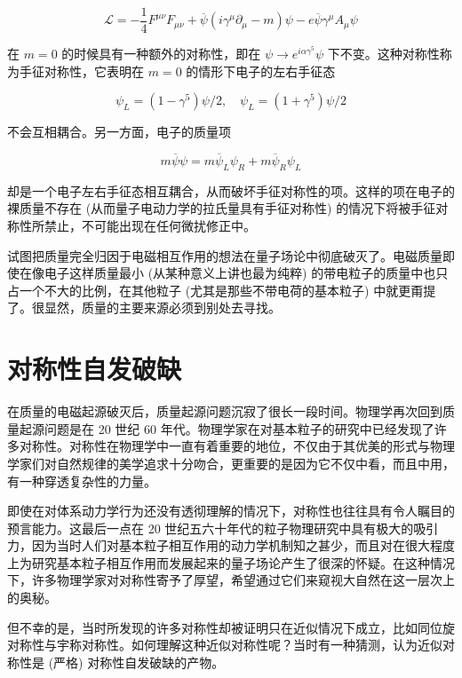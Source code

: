 \begin{equation}
    \mathcal{L} = -\frac{1}{4} F^{\mu\nu} F_{\mu\nu} + \overline{\psi}(i\gamma^\mu\partial_\mu - m) \psi - e \overline{\psi} \gamma^\mu A_\mu \psi
\end{equation}

在 $m=0$ 的时候具有一种额外的对称性，即在 $\psi \to e^{i\alpha\gamma^5} \psi$ 下不变。这种对称性称为手征对称性，它表明在 $m=0$ 的情形下电子的左右手征态

\begin{equation}
    \psi_L = (1-\gamma^5) \psi/2, \quad \psi_L = (1+\gamma^5) \psi/2
\end{equation}

\noindent 不会互相耦合。另一方面，电子的质量项

\begin{equation}
    m \overline{\psi} \psi = m \overline{\psi}_L \psi_R + m \overline{\psi}_R \psi_L
\end{equation}

却是一个电子左右手征态相互耦合，从而破坏手征对称性的项。这样的项在电子的裸质量不存在 (从而量子电动力学的拉氏量具有手征对称性) 的情况下将被手征对称性所禁止，不可能出现在任何微扰修正中。

试图把质量完全归因于电磁相互作用的想法在量子场论中彻底破灭了。电磁质量即使在像电子这样质量最小 (从某种意义上讲也最为纯粹) 的带电粒子的质量中也只占一个不大的比例，在其他粒子 (尤其是那些不带电荷的基本粒子) 中就更甭提了。很显然，质量的主要来源必须到别处去寻找。

\section{对称性自发破缺}

在质量的电磁起源破灭后，质量起源问题沉寂了很长一段时间。物理学再次回到质量起源问题是在 20 世纪 60 年代。物理学家在对基本粒子的研究中已经发现了许多对称性。对称性在物理学中一直有着重要的地位，不仅由于其优美的形式与物理学家们对自然规律的美学追求十分吻合，更重要的是因为它不仅中看，而且中用，有一种穿透复杂性的力量。

即使在对体系动力学行为还没有透彻理解的情况下，对称性也往往具有令人瞩目的预言能力。这最后一点在 20 世纪五六十年代的粒子物理研究中具有极大的吸引力，因为当时人们对基本粒子相互作用的动力学机制知之甚少，而且对在很大程度上为研究基本粒子相互作用而发展起来的量子场论产生了很深的怀疑。在这种情况下，许多物理学家对对称性寄予了厚望，希望通过它们来窥视大自然在这一层次上的奥秘。

但不幸的是，当时所发现的许多对称性却被证明只在近似情况下成立，比如同位旋对称性与宇称对称性。如何理解这种近似对称性呢？当时有一种猜测，认为近似对称性是 (严格) 对称性自发破缺的产物。

